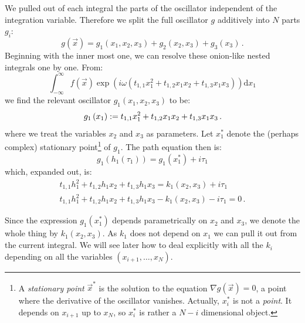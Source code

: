 \documentclass[a4paper,10pt]{article}
\begin{document}
We pulled out of each integral the parts of the oscillator
independent of the integration variable. Therefore we split
the full oscillator $g$ additively into $N$ parts $g_i$:
\begin{equation}
  g(\vec{x}) = g_1(x_1, x_2, x_3) + g_2(x_2, x_3) + g_3(x_3)\,.
\end{equation}
Beginning with the inner most one, we can resolve these onion-like
nested integrals one by one. From:
\begin{equation}
 \int_{-\infty}^{\infty} f\left(\vec{x}\right)
   \exp\left(i \omega \left(t_{1,1} x_1^2 + t_{1,2} x_1 x_2 + t_{1,3} x_1 x_3\right) \right)
 \mathrm{d}x_1
\end{equation}
we find the relevant oscillator $g_1(x_1, x_2, x_3)$ to be:
\begin{equation}
  g_1\left(x_1\right) := t_{1,1} x_1^2 + t_{1,2} x_1 x_2 + t_{1,3} x_1 x_3 \,.
\end{equation}
where we treat the variables $x_2$ and $x_3$ as parameters.
Let $x_1^*$ denote the (perhaps complex) stationary point\footnote{A
\emph{stationary point} $\vec{x}^{*}$ is the solution to the equation
$\nabla g(\vec{x}) = 0$, a point where the derivative of the oscillator vanishes.
Actually, $x_i^{*}$ is not a \emph{point}.
It depends on $x_{i+1}$ up to $x_N$, so $x_i^{*}$ is rather a $N-i$
dimensional object.} of $g_1$. The path equation then is:
\begin{equation}
  g_1\left(h_1(\tau_1)\right) = g_1\left(x_1^{*}\right) + i \tau_1
\end{equation}
which, expanded out, is:
\begin{gather}
  t_{1,1} h_1^2 + t_{1,2} h_1 x_2 + t_{1,3} h_1 x_3 = k_1(x_2, x_3) + i \tau_1 \\
  t_{1,1} h_1^2 + t_{1,2} h_1 x_2 + t_{1,3} h_1 x_3 - k_1(x_2, x_3) - i \tau_1 = 0 \,.
\end{gather}

Since the expression $g_1\left(x_1^{*}\right)$ depends parametrically on
$x_2$ and $x_3$, we denote the whole thing by $k_1\left(x_2, x_3\right)$.
As $k_1$ does not depend on $x_1$ we can pull it out from the
current integral. We will see later how to deal explicitly with
all the $k_i$ depending on all the variables $\left(x_{i+1}, \ldots ,x_N\right)$.
\end{document}

